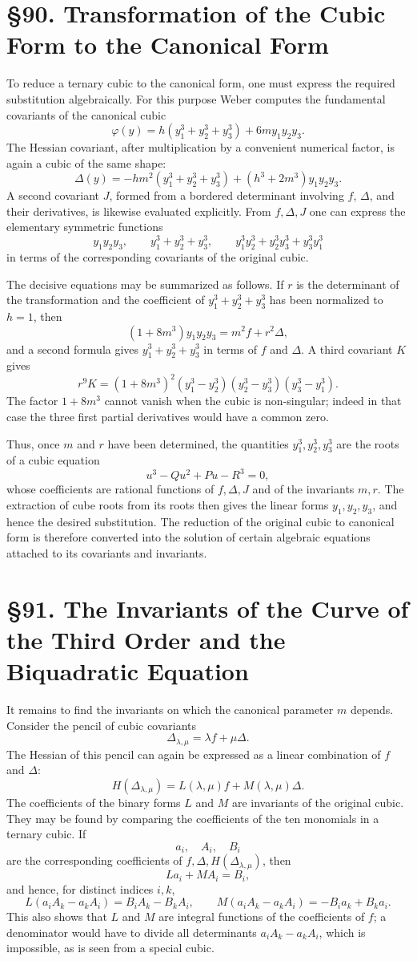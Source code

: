 \documentclass[11pt,a4paper]{book}
\newcommand{\webersection}[2]{\clearpage\section*{\S #1. #2}}
\begin{document}
\webersection{90}{Transformation of the Cubic Form to the Canonical Form}

To reduce a ternary cubic to the canonical form, one must express the required substitution algebraically.  For this purpose Weber computes the fundamental covariants of the canonical cubic
\[
\varphi(y)=h(y_1^3+y_2^3+y_3^3)+6my_1y_2y_3.
\]
The Hessian covariant, after multiplication by a convenient numerical factor, is again a cubic of the same shape:
\[
\Delta(y)=-hm^2(y_1^3+y_2^3+y_3^3)+(h^3+2m^3)y_1y_2y_3.
\]
A second covariant \(J\), formed from a bordered determinant involving \(f\), \(\Delta\), and their derivatives, is likewise evaluated explicitly.  From \(f,\Delta,J\) one can express the elementary symmetric functions
\[
y_1y_2y_3,\qquad
y_1^3+y_2^3+y_3^3,\qquad
y_1^3y_2^3+y_2^3y_3^3+y_3^3y_1^3
\]
in terms of the corresponding covariants of the original cubic.

The decisive equations may be summarized as follows.  If \(r\) is the determinant of the transformation and the coefficient of \(y_1^3+y_2^3+y_3^3\) has been normalized to \(h=1\), then
\[
(1+8m^3)y_1y_2y_3=m^2 f+r^2\Delta,
\]
and a second formula gives \(y_1^3+y_2^3+y_3^3\) in terms of \(f\) and \(\Delta\).  A third covariant \(K\) gives
\[
r^9K=(1+8m^3)^2
(y_1^3-y_2^3)(y_2^3-y_3^3)(y_3^3-y_1^3).
\]
The factor \(1+8m^3\) cannot vanish when the cubic is non-singular; indeed in that case the three first partial derivatives would have a common zero.

Thus, once \(m\) and \(r\) have been determined, the quantities \(y_1^3,y_2^3,y_3^3\) are the roots of a cubic equation
\[
u^3-Qu^2+Pu-R^3=0,
\]
whose coefficients are rational functions of \(f,\Delta,J\) and of the invariants \(m,r\).  The extraction of cube roots from its roots then gives the linear forms \(y_1,y_2,y_3\), and hence the desired substitution.  The reduction of the original cubic to canonical form is therefore converted into the solution of certain algebraic equations attached to its covariants and invariants.

\webersection{91}{The Invariants of the Curve of the Third Order and the Biquadratic Equation}

It remains to find the invariants on which the canonical parameter \(m\) depends.  Consider the pencil of cubic covariants
\[
\Delta_{\lambda,\mu}=\lambda f+\mu\Delta.
\]
The Hessian of this pencil can again be expressed as a linear combination of \(f\) and \(\Delta\):
\[
H(\Delta_{\lambda,\mu})=L(\lambda,\mu)f+M(\lambda,\mu)\Delta.
\]
The coefficients of the binary forms \(L\) and \(M\) are invariants of the original cubic.  They may be found by comparing the coefficients of the ten monomials in a ternary cubic.  If
\[
a_i,\quad A_i,\quad B_i
\]
are the corresponding coefficients of \(f,\Delta,H(\Delta_{\lambda,\mu})\), then
\[
La_i+MA_i=B_i,
\]
and hence, for distinct indices \(i,k\),
\[
L(a_iA_k-a_kA_i)=B_iA_k-B_kA_i,\qquad
M(a_iA_k-a_kA_i)=-B_ia_k+B_ka_i.
\]
This also shows that \(L\) and \(M\) are integral functions of the coefficients of \(f\); a denominator would have to divide all determinants \(a_iA_k-a_kA_i\), which is impossible, as is seen from a special cubic.
\end{document}
